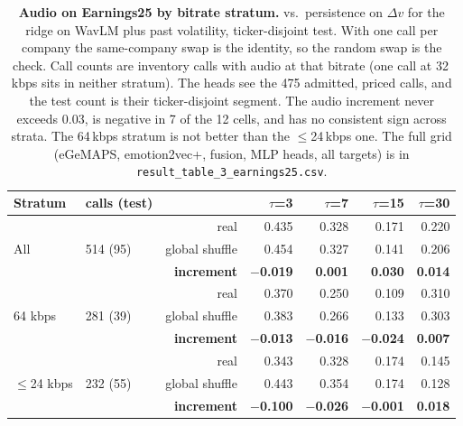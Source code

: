 \begin{table}[t]
\centering
\small
\begin{tabular}{llrrrrr}
\toprule
Stratum & calls (test) & & $\tau$=3 & $\tau$=7 & $\tau$=15 & $\tau$=30 \\
\midrule
\multirow{3}{*}{All} & \multirow{3}{*}{514 (95)} & real & 0.435 & 0.328 & 0.171 & 0.220 \\
 & & global shuffle & 0.454 & 0.327 & 0.141 & 0.206 \\
 & & \textbf{increment} & \textbf{$-$0.019} & \textbf{0.001} & \textbf{0.030} & \textbf{0.014} \\
\midrule
\multirow{3}{*}{64 kbps} & \multirow{3}{*}{281 (39)} & real & 0.370 & 0.250 & 0.109 & 0.310 \\
 & & global shuffle & 0.383 & 0.266 & 0.133 & 0.303 \\
 & & \textbf{increment} & \textbf{$-$0.013} & \textbf{$-$0.016} & \textbf{$-$0.024} & \textbf{0.007} \\
\midrule
\multirow{3}{*}{$\le$24 kbps} & \multirow{3}{*}{232 (55)} & real & 0.343 & 0.328 & 0.174 & 0.145 \\
 & & global shuffle & 0.443 & 0.354 & 0.174 & 0.128 \\
 & & \textbf{increment} & \textbf{$-$0.100} & \textbf{$-$0.026} & \textbf{$-$0.001} & \textbf{0.018} \\
\bottomrule
\end{tabular}
\caption{\textbf{Audio on Earnings25 by bitrate stratum.} \Rtwo{} vs.\
persistence on $\Delta v$ for the ridge on WavLM plus past volatility,
ticker-disjoint test. With one call per company the same-company swap is the
identity, so the random swap is the check. Call counts are inventory calls with
audio at that bitrate (one call at 32\,kbps sits in neither stratum). The heads see
the 475 admitted, priced calls, and the test count is their ticker-disjoint segment.
The audio increment never exceeds 0.03, is negative in 7 of the 12 cells, and has no
consistent sign across strata. The 64\,kbps stratum is not better than the
$\le$24\,kbps one. The full grid (eGeMAPS, emotion2vec+, fusion, MLP heads, all
targets) is in \texttt{result\_table\_3\_earnings25.csv}.}
\label{tab:earnings25-audio}
\end{table}
